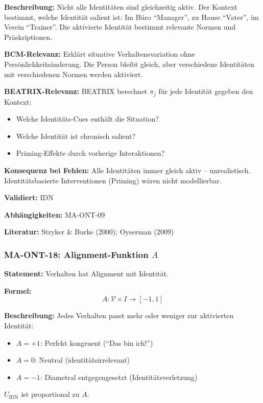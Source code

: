 \textbf{Beschreibung:}
Nicht alle Identitäten sind gleichzeitig aktiv. Der Kontext bestimmt, welche Identität salient ist: Im Büro ``Manager'', zu Hause ``Vater'', im Verein ``Trainer''. Die aktivierte Identität bestimmt relevante Normen und Präskriptionen.

\textbf{BCM-Relevanz:}
Erklärt situative Verhaltensvariation ohne Persönlichkeitsänderung. Die Person bleibt gleich, aber verschiedene Identitäten mit verschiedenen Normen werden aktiviert.

\textbf{BEATRIX-Relevanz:}
BEATRIX berechnet $\pi_j$ für jede Identität gegeben den Kontext:
\begin{itemize}
    \item Welche Identitäts-Cues enthält die Situation?
    \item Welche Identität ist chronisch salient?
    \item Priming-Effekte durch vorherige Interaktionen?
\end{itemize}

\textbf{Konsequenz bei Fehlen:}
Alle Identitäten immer gleich aktiv -- unrealistisch. Identitätsbasierte Interventionen (Priming) wären nicht modellierbar.

\textbf{Validiert:} IDN

\textbf{Abhängigkeiten:} MA-ONT-09

\textbf{Literatur:} Stryker \& Burke (2000); Oyserman (2009)


\subsubsection*{MA-ONT-18: Alignment-Funktion $A$}

\textbf{Statement:} Verhalten hat Alignment mit Identität.

\textbf{Formel:}
\begin{equation}
A: \mathcal{V} \times I \rightarrow [-1, 1]
\end{equation}

\textbf{Beschreibung:}
Jedes Verhalten passt mehr oder weniger zur aktivierten Identität:
\begin{itemize}
    \item $A = +1$: Perfekt kongruent (``Das bin ich!'')
    \item $A = 0$: Neutral (identitätsirrelevant)
    \item $A = -1$: Diametral entgegengesetzt (Identitätsverletzung)
\end{itemize}
$U_{\text{IDN}}$ ist proportional zu $A$.

